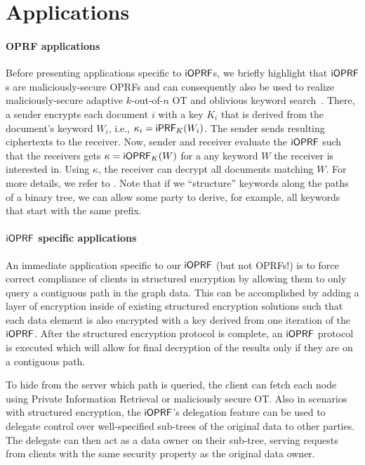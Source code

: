 \section{Applications}
\label{sec:applications}
\paragraph{OPRF applications} Before presenting applications specific to $\mathsf{i}\mathsf{OPRF}$s, we briefly
highlight that $\mathsf{i}\mathsf{OPRF}$s are maliciously-secure OPRFs and can consequently also be used to realize
maliciously-secure adaptive $k$-out-of-$n$ OT and oblivious keyword
search~\cite{adaptiveot,oks}. There, a sender encrypts each document
$i$ with a key $K_i$ that is derived from the document's keyword
$W_i$, i.e., $\kappa_i = \mathsf{i}\mathsf{PRF}_K(W_i)$. The sender sends resulting
ciphertexts to the receiver. Now, sender and receiver evaluate the
$\mathsf{i}\mathsf{OPRF}$ such that the receivers gets $\kappa=\mathsf{i}\mathsf{OPRF}_K(W)$ for a any
keyword $W$ the receiver is interested in. Using $\kappa$, the
receiver can decrypt all documents matching $W$. For more details, we
refer to \citet{oks}.  Note that if we ``structure'' keywords along
the paths of a binary tree, we can allow some party to derive, for
example, all keywords that start with the same prefix.

\paragraph{$\mathsf{i}\mathsf{OPRF}$ specific applications}
An immediate application specific to our $\mathsf{i}\mathsf{OPRF}$ (but not OPRFs!) is to force correct
compliance of clients in structured encryption by allowing them to
only query a contiguous path in the graph data.  This can be
accomplished by adding a layer of encryption inside of existing
structured encryption solutions such that each data element is also
encrypted with a key derived from one iteration of the $\mathsf{i}\mathsf{OPRF}$.
After the structured encryption protocol is complete, an $\mathsf{i}\mathsf{OPRF}$
protocol is executed which will allow for final decryption of the
results only if they are on a contiguous path.

To hide from the server which path is queried, the client can fetch
each node using Private Information Retrieval or maliciously secure
OT.
Also in scenarios with structured encryption, the $\mathsf{i}\mathsf{OPRF}$'s
delegation feature can be used to delegate control over well-specified
sub-trees of the original data to other parties. The delegate can then
act as a data owner on their sub-tree, serving requests from clients
with the same security property as the original data owner.

